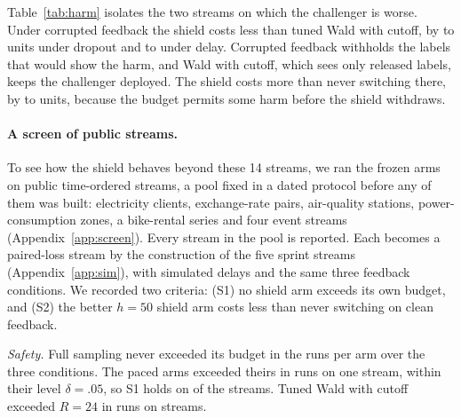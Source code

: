 \documentclass[10pt]{article}
\theoremstyle{plain}
\theoremstyle{definition}
\begin{document}
Table~\ref{tab:harm} isolates the two streams on which the challenger is worse. Under corrupted feedback the shield costs less than tuned Wald with cutoff, by \HarmDropMin{} to \HarmDropMax{} units under dropout and \HarmDelayMin{} to \HarmDelayMax{} under delay. Corrupted feedback withholds the labels that would show the harm, and Wald with cutoff, which sees only released labels, keeps the challenger deployed. The shield costs more than never switching there, by \HarmNeverMin{} to \HarmNeverMax{} units, because the budget permits some harm before the shield withdraws.

\paragraph{A screen of \ScreenPool{} public streams.}
To see how the shield behaves beyond these 14 streams, we ran the frozen arms on \ScreenPool{} public time-ordered streams, a pool fixed in a dated protocol before any of them was built: electricity clients, exchange-rate pairs, air-quality stations, power-consumption zones, a bike-rental series and four event streams (Appendix~\ref{app:screen}). Every stream in the pool is reported. Each becomes a paired-loss stream by the construction of the five sprint streams (Appendix~\ref{app:sim}), with simulated delays and the same three feedback conditions. We recorded two criteria: (S1) no shield arm exceeds its own budget, and (S2) the better $h=50$ shield arm costs less than never switching on clean feedback.

\emph{Safety.} Full sampling never exceeded its budget in the \ScreenRunsPerArm{} runs per arm over the three conditions. The paced arms exceeded theirs in \ScreenPacedViol{} runs on one stream, within their level $\delta=.05$, so S1 holds on \ScreenSOne{} of the \ScreenPool{} streams. Tuned Wald with cutoff exceeded $R=24$ in \ScreenWaldExceedRuns{} runs on \ScreenWaldExceedStreams{} streams.
\end{document}
